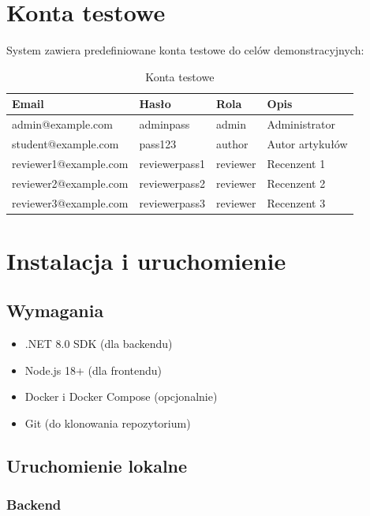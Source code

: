 \documentclass[times]{san}
\begin{document}
\section{Konta testowe}

System zawiera predefiniowane konta testowe do celów demonstracyjnych:

\begin{table}[h]
\centering
\caption{Konta testowe}
\label{tab:test_accounts}
\begin{tabular}{|l|l|l|l|}
\hline
Email & Hasło & Rola & Opis \\
\hline
admin@example.com & adminpass & admin & Administrator \\
student@example.com & pass123 & author & Autor artykułów \\
reviewer1@example.com & reviewerpass1 & reviewer & Recenzent 1 \\
reviewer2@example.com & reviewerpass2 & reviewer & Recenzent 2 \\
reviewer3@example.com & reviewerpass3 & reviewer & Recenzent 3 \\
\hline
\end{tabular}
\end{table}

\section{Instalacja i uruchomienie}

\subsection{Wymagania}

\begin{itemize}
    \item .NET 8.0 SDK (dla backendu)
    \item Node.js 18+ (dla frontendu)
    \item Docker i Docker Compose (opcjonalnie)
    \item Git (do klonowania repozytorium)
\end{itemize}

\subsection{Uruchomienie lokalne}

\subsubsection{Backend}
\end{document}
